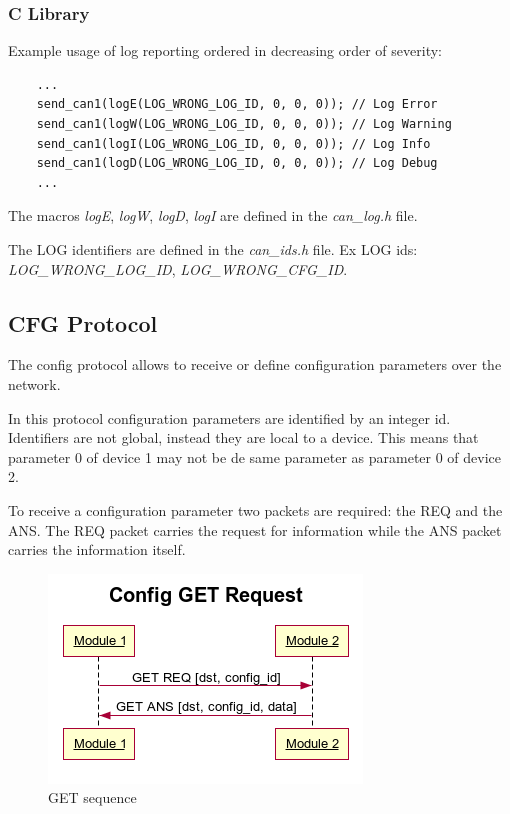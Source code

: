 \documentclass[11pt, a4paper]{article}
\begin{document}
{\subsubsection{C Library}
Example usage of log reporting ordered in decreasing order of severity:
\begin{verbatim}
	...
	send_can1(logE(LOG_WRONG_LOG_ID, 0, 0, 0)); // Log Error
	send_can1(logW(LOG_WRONG_LOG_ID, 0, 0, 0)); // Log Warning
	send_can1(logI(LOG_WRONG_LOG_ID, 0, 0, 0)); // Log Info
	send_can1(logD(LOG_WRONG_LOG_ID, 0, 0, 0)); // Log Debug
	...
\end{verbatim}

The macros \textit{logE}, \textit{logW}, \textit{logD}, \textit{logI} are defined in the \textit{can\_log.h} file.

The LOG identifiers are defined in the \textit{can\_ids.h} file. Ex LOG ids: \textit{LOG\_WRONG\_LOG\_ID}, \textit{LOG\_WRONG\_CFG\_ID}.

\subsection{CFG Protocol}
The config protocol allows to receive or define configuration parameters over the network.

In this protocol configuration parameters are identified by an integer id. Identifiers are not global, instead they are local to a device. This means that parameter 0 of device 1 may not be de same parameter as parameter 0 of device 2.

To receive a configuration parameter two packets are required: the REQ and the ANS. The REQ packet carries the request for information while the ANS packet carries the information itself.

\begin{figure}[H]
	\centering
	\includegraphics[width=0.6\linewidth]{config_get.png}
	\caption{GET sequence}%
	\label{fig:cmd_protocol}
\end{figure}

}
\end{document}
